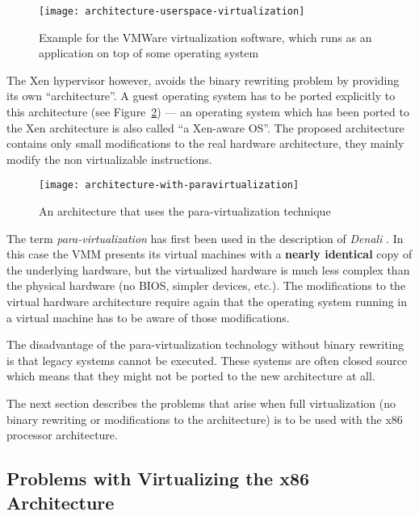 \begin{figure}[htbp]
  \centering
  \texttt{[image: architecture-userspace-virtualization]}
  \caption[Virtualization  in  the   user-space]{Example  for  the  VMWare
    virtualization software, which  runs as an application on  top of some
    operating system}
  \label{fig:arch-userspace-virt}
\end{figure}

The Xen hypervisor \cite{xen} however, avoids the binary rewriting problem
by providing its own ``architecture''.  A guest operating system has to be
ported       explicitly        to       this       architecture       (see
Figure~\ref{fig:arch-para-virt})  --- an operating  system which  has been
ported to  the Xen  architecture is also  called ``a Xen-aware  OS''.  The
proposed  architecture  contains  only  small modifications  to  the  real
hardware  architecture,  \ie  they  mainly modify  the  non  virtualizable
instructions.

\begin{figure}[htbp]
  \centering
  \texttt{[image: architecture-with-paravirtualization]}
  \caption[Para-virtualization architecture]{An architecture that uses the
    para-virtualization technique}
  \label{fig:arch-para-virt}
\end{figure}

The term \emph{para-virtualization} has first been used in the description
of \emph{Denali} \cite{denali}.  In this case the VMM presents its virtual
machines with a \textbf{nearly identical} copy of the underlying hardware,
but  the virtualized  hardware  is  much less  complex  than the  physical
hardware  (no BIOS,  simpler  devices, etc.).   The  modifications to  the
virtual  hardware architecture  require  again that  the operating  system
running in a virtual machine has to be aware of those modifications.

The  disadvantage  of the  para-virtualization  technology without  binary
rewriting is  that legacy  systems cannot be  executed. These  systems are
often closed source  which means that they might not be  ported to the new
architecture at all.

The   next  section   describes  the   problems  that   arise   when  full
virtualization  (\ie   no  binary   rewriting  or  modifications   to  the
architecture) is to be used with the x86 processor architecture.

\subsection{Problems with Virtualizing the x86 Architecture}
\label{sec:x86-problems}

